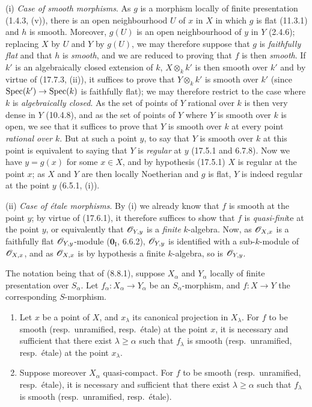 (i) \emph{Case of smooth morphisms}. As $g$ is a morphism locally of finite presentation (1.4.3, (v)), there is an open neighbourhood $U$ of $x$ in $X$ in which $g$ is flat (11.3.1) and $h$ is smooth. Moreover, $g(U)$ is an open neighbourhood of $y$ in $Y$ (2.4.6); replacing $X$ by $U$ and $Y$ by $g(U)$, we may therefore suppose that $g$ is \emph{faithfully flat} and that $h$ is \emph{smooth}, and we are reduced to proving that $f$ is then \emph{smooth}. If $k'$ is an algebraically
closed extension of $k$, $X\otimes_k k'$ is then smooth over $k'$ and by virtue of (17.7.3, (ii)), it suffices to prove that $Y\otimes_k k'$ is smooth over $k'$ (since $\operatorname{Spec}(k')\to\operatorname{Spec}(k)$ is faithfully flat); we may therefore restrict to the case where $k$ is \emph{algebraically closed}. As the set of points of $Y$ rational over $k$ is then very dense in $Y$ (10.4.8), and as the set of points of $Y$ where $Y$ is smooth over $k$ is open, we see that it suffices to prove that $Y$ is smooth over $k$ at every point \emph{rational over $k$}. But at such a point $y$, to say that $Y$ is smooth over $k$ at this point is equivalent to saying that $Y$ is \emph{regular} at $y$ (17.5.1 and 6.7.8). Now we have $y=g(x)$ for some $x\in X$, and by hypothesis (17.5.1) $X$ is regular at the point $x$; as $X$ and $Y$ are then locally Noetherian and $g$ is flat, $Y$ is indeed regular at the point $y$ (6.5.1, (i)).

(ii) \emph{Case of étale morphisms}. By (i) we already know that $f$ is smooth at the point $y$; by virtue of (17.6.1), it therefore suffices to show that $f$ is \emph{quasi-fini}te at the point $y$, or equivalently that $\mathscr{O}_{Y,y}$ is a \emph{finite} $k$-algebra. Now, as $\mathscr{O}_{X,x}$ is a faithfully flat $\mathscr{O}_{Y,y}$-module ($\mathbf{0}_{\mathrm I}$, 6.6.2), $\mathscr{O}_{Y,y}$ is identified with a sub-$k$-module of $\mathscr{O}_{X,x}$, and as $\mathscr{O}_{X,x}$ is by hypothesis a finite $k$-algebra, so is $\mathscr{O}_{Y,y}$.

\begin{proposition}[17.7.8]
\label{IV.17.7.8}
The notation being that of \textup{(8.8.1)}, suppose $X_\alpha$ and $Y_\alpha$ locally of finite presentation over $S_\alpha$. Let $f_\alpha:X_\alpha\to Y_\alpha$ be an $S_\alpha$-morphism, and $f:X\to Y$ the corresponding $S$-morphism.
\begin{enumerate}
  \item[\textup{(i)}] Let $x$ be a point of $X$, and $x_\lambda$ its canonical projection in $X_\lambda$. For $f$ to be smooth \textup{(resp.}\ unramified, \textup{resp.}\ étale\textup{)} at the point $x$, it is necessary and sufficient that there exist $\lambda\geq\alpha$ such that $f_\lambda$ is smooth \textup{(resp.}\ unramified, \textup{resp.}\ étale\textup{)} at the point $x_\lambda$.
  \item[\textup{(ii)}] Suppose moreover $X_\alpha$ quasi-compact. For $f$ to be smooth \textup{(resp.}\ unramified, \textup{resp.}\ étale\textup{)}, it is necessary and sufficient that there exist $\lambda\geq\alpha$ such that $f_\lambda$ is smooth \textup{(resp.}\ unramified, \textup{resp.}\ étale\textup{)}.
\end{enumerate}
\end{proposition}


